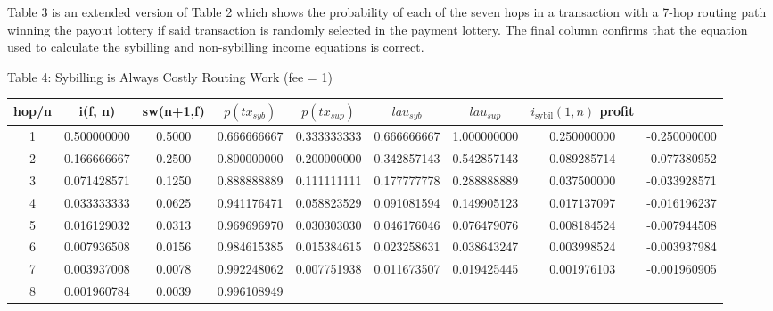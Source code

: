 \documentclass[oneside]{article}   	%
\begin{document}
\bigskip
Table 3 is an extended version of Table 2 which shows the probability of each of the seven hops in a transaction with a 7-hop routing path winning the payout lottery if said transaction is randomly selected in the payment lottery. The final column confirms that the equation used to calculate the sybilling and non-sybilling income equations is correct.

\pagebreak


\begin{center}
Table 4: Sybilling is Always Costly Routing Work (fee = 1)
\bigskip
\begin{tabular}{ |c|c|c|c|c|c|c|c|c| } 
 \hline
 hop/n & 
 i(f, n) & 
 sw(n+1,f) & 
 \begin{math}p(tx_{syb})\end{math} & 
 \begin{math}p(tx_{sup})\end{math} & 
 \begin{math}lau_{syb}\end{math} &
 \begin{math}lau_{sup}\end{math} &
 \begin{math}i_{\text{sybil}}(1, n)\end{math}
 profit \\
 \hline
1 & 
0.500000000 & 
0.5000 & 
0.666666667 & 
0.333333333 & 
0.666666667 & 
1.000000000 & 
0.250000000 & 
-0.250000000 \\
2 &
0.166666667 & 
0.2500 & 
0.800000000 & 
0.200000000 & 
0.342857143 & 
0.542857143 & 
0.089285714 & 
-0.077380952 \\
3 & 
0.071428571 & 
0.1250 & 
0.888888889 & 
0.111111111 & 
0.177777778 & 
0.288888889 & 
0.037500000 & 
-0.033928571 \\
4 & 
0.033333333 & 
0.0625 & 
0.941176471 & 
0.058823529 & 
0.091081594 & 
0.149905123 & 
0.017137097 & 
-0.016196237 \\
5 & 
0.016129032 & 
0.0313 & 
0.969696970 & 
0.030303030 & 
0.046176046 & 
0.076479076 & 
0.008184524 & 
-0.007944508 \\
6 & 
0.007936508 & 
0.0156 & 
0.984615385 & 
0.015384615 & 
0.023258631 & 
0.038643247 & 
0.003998524 & 
-0.003937984 \\
7 & 
0.003937008 & 
0.0078 & 
0.992248062 & 
0.007751938 & 
0.011673507 & 
0.019425445 & 
0.001976103 & 
-0.001960905 \\
8 & 
0.001960784 & 
0.0039 & 
0.996108949 & 

\end{tabular}
\end{center}
\end{document}
